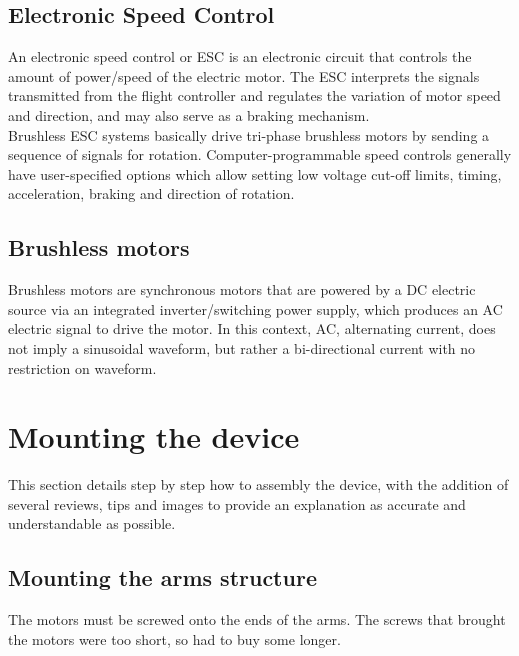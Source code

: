 \documentclass[12pt, a4paper,twoside]{tesi_upf}
\begin{document}
\section{Electronic Speed Control}

An electronic speed control or ESC is an electronic circuit that controls the amount of power/speed of the electric motor. The ESC interprets the signals transmitted from the flight controller and regulates the variation of motor speed and direction, and may also serve as a braking mechanism.
\\[12pt]

Brushless ESC systems basically drive tri-phase brushless motors by sending a sequence of signals for rotation. Computer-programmable speed controls generally have user-specified options which allow setting low voltage cut-off limits, timing, acceleration, braking and direction of rotation.

\section{Brushless motors}

Brushless motors are synchronous motors that are powered by a DC electric source via an integrated inverter/switching power supply, which produces an AC electric signal to drive the motor. In this context, AC, alternating current, does not imply a sinusoidal waveform, but rather a bi-directional current with no restriction on waveform. 


\chapter{Mounting the device}

This section details step by step how to assembly the device, with the addition of several reviews, tips and images to provide an explanation as accurate and understandable as possible.

\section{Mounting the arms structure}

The motors must be screwed onto the ends of the arms. The screws that brought the motors were too short, so had to buy some longer.
\end{document}
